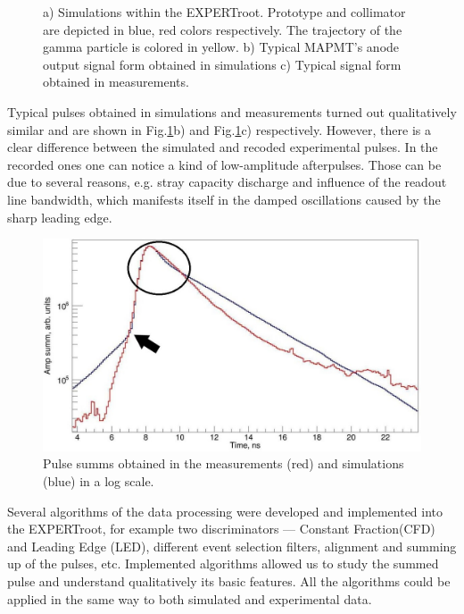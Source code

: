 \documentclass{webofc}
\newcommand{\er}{\textmd{EXPERTroot}}
\begin{document}
\begin{figure}[h]
\begin{minipage}[h]{0.35\linewidth}
	\end{minipage}
	\caption{a) Simulations within the \er. Prototype and collimator are depicted in blue, red colors respectively. The trajectory of the gamma particle is colored in yellow. b) Typical MAPMT's anode output signal form obtained in simulations c) Typical signal form obtained in measurements.}
	\label{ris:sim}
\end{figure}
Typical pulses obtained in simulations and measurements turned out qualitatively similar and are shown in Fig.\ref{ris:sim}b) and Fig.\ref{ris:sim}c) respectively. However, there is a clear difference between the simulated and recoded experimental pulses. In the recorded ones one can notice a kind of low-amplitude afterpulses. Those can be due to several reasons, e.g. stray capacity discharge and influence of the readout line bandwidth, which manifests itself in the damped oscillations caused by the sharp leading edge.

\begin{figure}
	\centering
	\includegraphics[width=0.68\linewidth]{summ1.png}
	\caption{Pulse summs obtained in the measurements (red) and simulations (blue) in a log scale.}\label{ris:sum}
\end{figure}

Several algorithms of the data processing were developed and implemented into the \er, for example two discriminators --- Constant Fraction(CFD) and Leading Edge (LED), different event selection filters, alignment and summing up of the pulses, etc. Implemented algorithms allowed us to study the summed pulse and understand qualitatively its basic features. All the algorithms could be applied in the same way to both simulated and experimental data.

\end{document}
